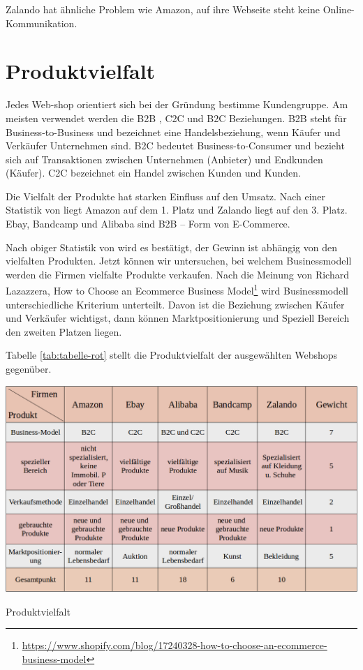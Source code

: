 Zalando hat ähnliche Problem wie Amazon, auf ihre Webseite steht keine Online- Kommunikation. \parencite{piatscheck}


\section{Produktvielfalt}

Jedes Web-shop orientiert sich bei der Gründung bestimme Kundengruppe.  Am meisten verwendet werden die B2B , C2C und B2C Beziehungen. B2B steht für Business-to-Business und bezeichnet eine Handelsbeziehung, wenn Käufer und Verkäufer Unternehmen sind. B2C bedeutet Business-to-Consumer und bezieht sich auf Transaktionen zwischen Unternehmen (Anbieter) und Endkunden (Käufer). C2C bezeichnet ein Handel zwischen Kunden und Kunden.

Die Vielfalt der Produkte hat starken Einfluss auf den Umsatz. Nach einer Statistik von \textcite{statista} liegt Amazon auf dem 1. Platz und Zalando liegt auf den 3. Platz. Ebay, Bandcamp und Alibaba sind B2B – Form von E-Commerce.

Nach obiger Statistik von \textcite{statista} wird es bestätigt, der Gewinn ist abhängig von den vielfalten Produkten. Jetzt können wir  untersuchen, bei welchem Businessmodell werden die Firmen vielfalte Produkte verkaufen. Nach die Meinung von Richard Lazazzera, How to Choose an Ecommerce Business Model\footnote{\url{https://www.shopify.com/blog/17240328-how-to-choose-an-ecommerce-business-model}} wird Businessmodell unterschiedliche Kriterium unterteilt. Davon ist die Beziehung zwischen Käufer und Verkäufer wichtigst, dann können Marktpositionierung und Speziell Bereich den zweiten Platzen liegen.

Tabelle \vref{tab:tabelle-rot} stellt die Produktvielfalt der ausgewählten Webshops gegenüber.

\begin{table}[htbp]
	\centering
	\includegraphics[width=1\textwidth]{bilder/tabelle-rot.png}
	\caption{Produktvielfalt}
	\label{tab:tabelle-rot}
\end{table}


